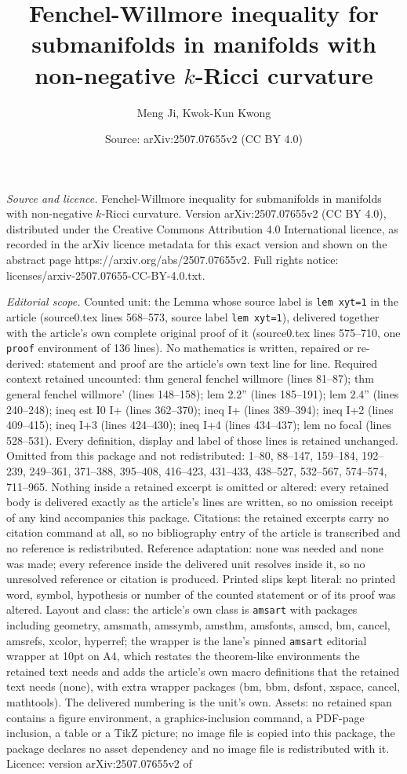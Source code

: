\documentclass[10pt,a4paper]{amsart}
\title[Fenchel-Willmore inequality for submanifolds in manifolds wi]{Fenchel-Willmore inequality for submanifolds in manifolds with non-negative $k$-Ricci curvature}
\author{Meng Ji, Kwok-Kun Kwong}
\date{Source: arXiv:2507.07655v2 (CC BY 4.0)}
\begin{document}
\maketitle

\noindent\emph{Source and licence.} Fenchel-Willmore inequality for submanifolds in manifolds with non-negative $k$-Ricci curvature. Version arXiv:2507.07655v2 (CC BY 4.0), distributed under the Creative Commons Attribution 4.0 International licence, as recorded in the arXiv licence metadata for this exact version and shown on the abstract page https://arxiv.org/abs/2507.07655v2. Full rights notice: licenses/arxiv-2507.07655-CC-BY-4.0.txt.\par\smallskip

\noindent\textit{Editorial scope.} Counted unit: the Lemma whose source label is \texttt{lem xyt=1} in the article (source0.tex lines 568--573, source label \texttt{lem xyt=1}), delivered together with the article's own complete original proof of it (source0.tex lines 575--710, one \texttt{proof} environment of 136 lines). No mathematics is written, repaired or re-derived: statement and proof are the article's own text line for line. Required context retained uncounted: thm general fenchel willmore (lines 81--87); thm general fenchel willmore' (lines 148--158); lem 2.2'' (lines 185--191); lem 2.4'' (lines 240--248); ineq est I0 I+ (lines 362--370); ineq I+ (lines 389--394); ineq I+2 (lines 409--415); ineq I+3 (lines 424--430); ineq I+4 (lines 434--437); lem no focal (lines 528--531). Every definition, display and label of those lines is retained unchanged. Omitted from this package and not redistributed: 1--80, 88--147, 159--184, 192--239, 249--361, 371--388, 395--408, 416--423, 431--433, 438--527, 532--567, 574--574, 711--965. Nothing inside a retained excerpt is omitted or altered: every retained body is delivered exactly as the article's lines are written, so no omission receipt of any kind accompanies this package. Citations: the retained excerpts carry no citation command at all, so no bibliography entry of the article is transcribed and no reference is redistributed. Reference adaptation: none was needed and none was made; every reference inside the delivered unit resolves inside it, so no unresolved reference or citation is produced. Printed slips kept literal: no printed word, symbol, hypothesis or number of the counted statement or of its proof was altered. Layout and class: the article's own class is \texttt{amsart} with packages including geometry, amsmath, amssymb, amsthm, amsfonts, amscd, bm, cancel, amsrefs, xcolor, hyperref; the wrapper is the lane's pinned \texttt{amsart} editorial wrapper at 10pt on A4, which restates the theorem-like environments the retained text needs and adds the article's own macro definitions that the retained text needs (none), with extra wrapper packages (bm, bbm, dsfont, xspace, cancel, mathtools). The delivered numbering is the unit's own. Assets: no retained span contains a figure environment, a graphics-inclusion command, a PDF-page inclusion, a table or a TikZ picture; no image file is copied into this package, the package declares no asset dependency and no image file is redistributed with it. Licence: version arXiv:2507.07655v2 of 
\end{document}
